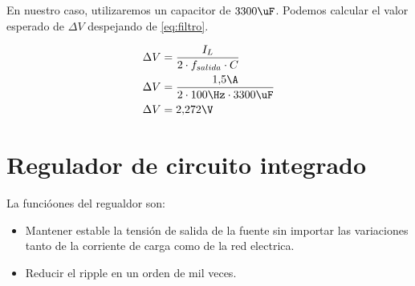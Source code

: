 En nuestro caso, utilizaremos un capacitor de $3300\uF$. Podemos calcular el valor esperado de $\Delta V$ despejando de \ref{eq:filtro}.

\begin{equation}
  \begin{aligned}
    \Delta V&=\frac{I_L}{2 \cdot f_{salida} \cdot C}\\
    \Delta V&=\frac{1{,}5\A}{2 \cdot 100\Hz \cdot 3300\uF}\\
    \Delta V&= 2{,}272 \V
  \end{aligned}
\end{equation}

\section{Regulador de circuito integrado}
La funcióones del regualdor son:

\begin{itemize}
  \item Mantener estable la tensión de salida de la fuente sin importar las variaciones tanto de la corriente de carga como de la red electrica.
  \item Reducir el ripple en un orden de mil veces.
\end{itemize}
